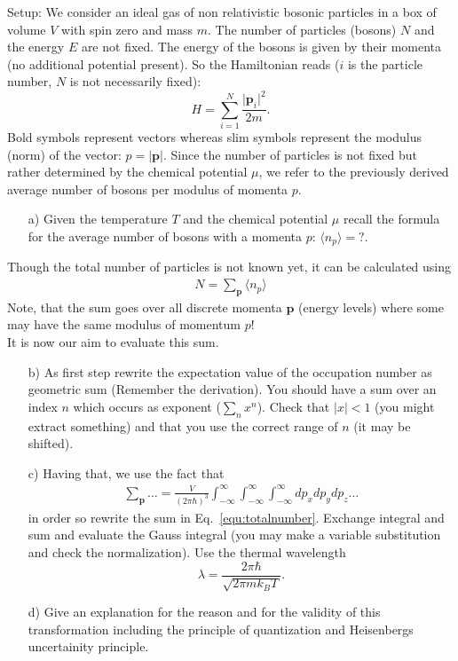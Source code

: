 \documentclass[12pt,a4paper]{article} %
\begin{document}
Setup: We consider an ideal gas of non relativistic bosonic particles in a box of volume $V$ with spin zero  and mass $m$. The number of particles (bosons) $N$ and the energy $E$ are not fixed.
The energy of the bosons is given by their momenta (no additional potential present). So the Hamiltonian reads ($i$ is the particle number, $N$ is not necessarily fixed):
$$ H = \sum_{i=1}^N \frac{\lvert \boldsymbol{p}_i \rvert^2}{2m}. $$
Bold symbols represent vectors whereas slim symbols represent the modulus (norm) of the vector: $p = \lvert \boldsymbol{p} \rvert$.
Since the number of particles is not fixed but rather determined by the chemical potential $\mu$, 
we refer to the previously derived average number of bosons per modulus of momenta $p$.
\begin{itemize}
\item[a)] Given the temperature $T$ and the chemical potential $\mu$ recall the formula for the average number of bosons with a momenta $p$: $\langle n_p \rangle =?$.
\end{itemize}
Though the total number of particles is not known yet, it can be calculated using
\begin{align}
 N= \sum_{\boldsymbol{p}} \langle n_p \rangle \label{equ:totalnumber}
\end{align}
Note, that the sum goes over all discrete momenta $\boldsymbol{p}$ (energy levels) where some may have the same modulus of momentum $p$!\\
It is now our aim to evaluate this sum. 

\begin{itemize} 
 \item[b)] As first step rewrite the expectation value of the occupation number as geometric sum (Remember the derivation). You should have a sum over an index $n$ which occurs as exponent ($\sum_n x^n$). Check that $|x| < 1$ (you might extract something) and that you use the correct range of $n$ (it may be shifted).
 \item[c)]Having that, we use the fact that 
 \begin{align}
\sum_{\boldsymbol{p}} \dots = \frac{V}{(2\pi\hbar)^3 }\int_{-\infty}^\infty \int_{-\infty}^\infty \int_{-\infty}^\infty dp_x dp_y dp_z \dots \label{equ:sum_to_integral}
 \end{align} in order so rewrite the sum in Eq.~\ref{equ:totalnumber}. Exchange integral and sum and evaluate the Gauss integral (you may make a variable substitution and check the normalization). Use the thermal wavelength $$\lambda = \frac{2\pi \hbar}{\sqrt{2\pi m k_B T}}.$$
 \item[d)] Give an explanation for the reason and for the validity of this transformation including the principle of quantization and Heisenbergs uncertainity principle.
\end{itemize}
\end{document}
